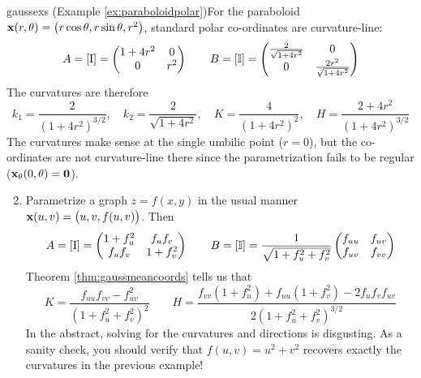 

\begin{examples}{}{gaussexs}
	\exstart (Example \ref{ex:paraboloidpolar})\lstsp For the paraboloid ${\mathbf{x}}(r,\theta)=\bigl(r\cos\theta,r\sin\theta,r^2\bigr)$, standard polar co-ordinates are curvature-line:
	  \[
	  	A=[\mathrm{I}]=
	  	\begin{pmatrix}
	  		1+4r^2&0\\0&r^2
	  	\end{pmatrix}
	  	\qquad
	  	B=[\mathbb{I}]=
	  	\begin{pmatrix}
	  		\frac 2{\sqrt{1+4r^2}}&0\\
	  		0&\frac{2r^2}{\sqrt{1+4r^2}}
	  	\end{pmatrix}
	  \]
	  The curvatures are therefore
	  \[
	  	k_1=\frac 2{(1+4r^2)^{3/2}}, \quad k_2=\frac 2{\sqrt{1+4r^2}}, \quad K=\frac 4{(1+4r^2)^2}, \quad H=\frac{2+4r^2}{(1+4r^2)^{3/2}}
	  \]
	  The curvatures make sense at the single umbilic point ($r=0$), but the co-ordinates are not curvature-line there since the parametrization fails to be regular (${\mathbf{x}}_\theta(0,\theta)=\mathbf{0}$).
	  
	\goodbreak
	
	\begin{enumerate}\setcounter{enumi}{1}
	  \item\label{ex:gaussgraph} Parametrize a graph $z=f(x,y)$ in the usual manner ${\mathbf{x}}(u,v)=\bigl(u,v,f(u,v)\bigr)$. Then
	  \[
	  	A=[\mathrm{I}]=
	  	\begin{pmatrix}
	  		1+f_u^2&f_uf_v\\
	  		f_uf_v&1+f_v^2
	  	\end{pmatrix}
	  	\qquad
	  	B=[\mathbb{I}]=\frac 1{\sqrt{1+f_u^2+f_v^2}}
	  	\begin{pmatrix}
	  		f_{uu}&f_{uv}\\
	  		f_{uv}&f_{vv}
	  	\end{pmatrix}
	  \]
	  Theorem \ref{thm:gaussmeancoords} tells us that
		\[
			K=\frac{f_{uu}f_{vv}-f_{uv}^2}{(1+f_u^2+f_v^2)^2} \qquad H=\frac{f_{vv}(1+f_u^2)+f_{uu}(1+f_v^2)-2f_uf_vf_{uv}}{2(1+f_u^2+f_v^2)^{3/2}}
		\]
		In the abstract, solving for the curvatures and directions is disgusting. As a sanity check, you should verify that $f(u,v)=u^2+v^2$ recovers exactly the curvatures in the previous example!
	  

\end{enumerate}
\end{examples}

